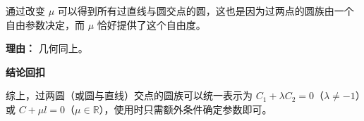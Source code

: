 \begin{proofbox}
\begin{description}[style=nextline, leftmargin=2.8em, labelsep=0.5em, itemsep=0.55em]
		\item[\textbf{步骤六（直线-圆参数完备）：}] 通过改变 $\mu$ 可以得到所有过直线与圆交点的圆，这也是因为过两点的圆族由一个自由参数决定，而 $\mu$ 恰好提供了这个自由度。
			\par\textbf{理由：} 几何同上。
	\end{description}

	\medskip
	\textbf{\textcolor{CProof}{结论回扣}}

	综上，过两圆（或圆与直线）交点的圆族可以统一表示为 $C_1+\lambda C_2=0$（$\lambda\neq -1$）或 $C+\mu l=0$（$\mu\in\mathbb{R}$），使用时只需额外条件确定参数即可。
\end{proofbox}
